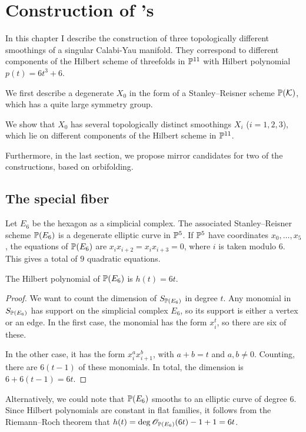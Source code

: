 \chapter{Construction of \CY's}
\label{sec:constructions}

In this chapter I describe the construction of three topologically different smoothings of a singular Calabi-Yau manifold. They correspond to different components of the Hilbert scheme of threefolds in $\P^{11}$ with Hilbert polynomial $p(t)=6t^3+6$. 

We first describe a degenerate \CY $X_0$ in the form of a Stanley--Reisner scheme $\P(\K)$, which has a quite large symmetry group.

We show that $X_0$ has several topologically distinct smoothings $X_i$ (${i=1,2,3}$), which lie on different components of the Hilbert scheme in $\P^{11}$.

Furthermore, in the last section, we propose mirror candidates for two of the constructions, based on orbifolding.

\section{The special fiber}

Let $E_6$ be the hexagon as a simplicial complex. The associated Stanley--Reisner scheme $\P(E_6)$ is a degenerate elliptic curve in $\P^5$. If $\P^5$ have coordinates $x_0,\ldots,x_5$, the equations of $\P(E_6)$ are $x_ix_{i+2}=x_ix_{i+3}=0$, where $i$ is taken modulo $6$. This gives a total of $9$ quadratic equations.

\begin{lemma}
The Hilbert polynomial of $\P(E_6)$ is $h(t)=6t$.
\end{lemma}
\begin{proof}
We want to count the dimension of $S_{\P(E_6)}$ in degree $t$. Any monomial in $S_{\P(E_6)}$ has support on the simplicial complex $E_6$, so its support is either a vertex or an edge. In the first case, the monomial has the form $x_i^t$, so there are six of these.

In the other case, it has the form $x_i^ax_{i+1}^b$, with $a+b=t$ and $a,b \neq 0$. Counting, there are $6(t-1)$ of these monomials. In total, the dimension is $6+6(t-1)=6t$.
\end{proof}
\begin{remark}
Alternatively, we could note that $\P(E_6)$ smooths to an elliptic curve of degree $6$. Since Hilbert polynomials are constant in flat families, it follows from the Riemann--Roch theorem that $h(t)=\deg \OO_{\P(E_6)}(6t)-1+1=6t$.
\end{remark}

